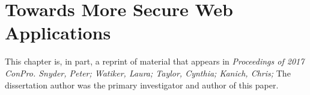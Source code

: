 \chapter{Towards More Secure Web Applications}
\label{future-web}

This chapter is, in part, a reprint of material that appears in
\textit{Proceedings of 2017 ConPro. Snyder, Peter;  Watiker, Laura; Taylor,
Cynthia; Kanich, Chris;} The dissertation author was the primary investigator and
author of this paper.






